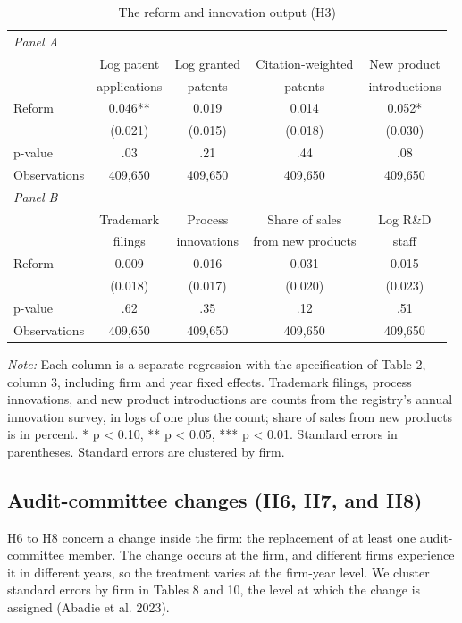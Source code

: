 \documentclass[12pt]{article}
\newcommand{\tabnote}[1]{\par\vspace{2pt}\begin{minipage}{\linewidth}\footnotesize\setstretch{1.0}\textit{Note:} #1\end{minipage}}
\begin{document}
\begin{table}[!htbp]
\centering
\begin{threeparttable}
\caption{The reform and innovation output (H3)}
\small
{}
\begin{tabular}{lcccc}
\toprule
\multicolumn{5}{l}{\textit{Panel A}} \\
 & Log patent & Log granted & Citation-weighted & New product \\
 & applications & patents & patents & introductions \\
\midrule
Reform & 0.046** & 0.019 & 0.014 & 0.052* \\
 & (0.021) & (0.015) & (0.018) & (0.030) \\
p-value & .03 & .21 & .44 & .08 \\
Observations & 409,650 & 409,650 & 409,650 & 409,650 \\
\midrule
\multicolumn{5}{l}{\textit{Panel B}} \\
 & Trademark & Process & Share of sales & Log R\&D \\
 & filings & innovations & from new products & staff \\
\midrule
Reform & 0.009 & 0.016 & 0.031 & 0.015 \\
 & (0.018) & (0.017) & (0.020) & (0.023) \\
p-value & .62 & .35 & .12 & .51 \\
Observations & 409,650 & 409,650 & 409,650 & 409,650 \\
\bottomrule
\end{tabular}
\tabnote{Each column is a separate regression with the specification of Table 2, column 3, including firm and year fixed effects. Trademark filings, process innovations, and new product introductions are counts from the registry's annual innovation survey, in logs of one plus the count; share of sales from new products is in percent. * p < 0.10, ** p < 0.05, *** p < 0.01. Standard errors in parentheses. Standard errors are clustered by firm.}
\end{threeparttable}
\end{table}

\subsection{Audit-committee changes (H6, H7, and H8)}

H6 to H8 concern a change inside the firm: the replacement of at least one audit-committee member. The change occurs at the firm, and different firms experience it in different years, so the treatment varies at the firm-year level. We cluster standard errors by firm in Tables 8 and 10, the level at which the change is assigned (Abadie et al. 2023).
\end{document}
